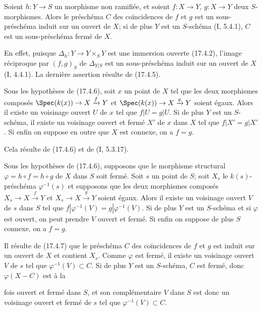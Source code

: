 \begin{proposition}[17.4.6]
\label{IV.17.4.6}
Soient $h:Y\to S$ un morphisme non ramifiée, et soient $f:X\to Y$, $g:X\to Y$ deux $S$-morphismes. Alors le préschéma $C$ des coïncidences de $f$ et $g$ est un sous-préschéma induit sur un ouvert de $X$; si de plus $Y$ est un $S$-schéma (I, 5.4.1), $C$ est un sous-préschéma fermé de $X$.
\end{proposition}

En effet, puisque $\Delta_h:Y\to Y\times_S Y$ est une immersion ouverte (17.4.2), l'image réciproque par $(f,g)_S$ de $\Delta_{Y|S}$ est un sous-préschéma induit sur un ouvert de $X$ (I, 4.4.1). La dernière assertion résulte de (17.4.5).

\begin{corollary}[17.4.7]
\label{IV.17.4.7}
Sous les hypothèses de (17.4.6), soit $x$ un point de $X$ tel que les deux morphismes composés $\Spec(k(x))\to X\xrightarrow{f}Y$ et $\Spec(k(x))\to X\xrightarrow{g}Y$ soient égaux. Alors il existe un voisinage ouvert $U$ de $x$ tel que $f|U=g|U$. Si de plus $Y$ est un $S$-schéma, il existe un voisinage ouvert et fermé $X'$ de $x$ dans $X$ tel que $f|X'=g|X'$. Si enfin on suppose en outre que $X$ est connexe, on a $f=g$.
\end{corollary}

Cela résulte de (17.4.6) et de (I, 5.3.17).

\begin{corollary}[17.4.8]
\label{IV.17.4.8}
Sous les hypothèses de (17.4.6), supposons que le morphisme structural $\varphi=h\circ f=h\circ g$ de $X$ dans $S$ soit fermé. Soit $s$ un point de $S$; soit $X_s$ le $k(s)$-préschéma $\varphi^{-1}(s)$ et supposons que les deux morphismes composés $X_s\to X\xrightarrow{f}Y$ et $X_s\to X\xrightarrow{g}Y$ soient égaux. Alors il existe un voisinage ouvert $V$ de $s$ dans $S$ tel que $f|\varphi^{-1}(V)=g|\varphi^{-1}(V)$. Si de plus $Y$ est un $S$-schéma et si $\varphi$ est ouvert, on peut prendre $V$ ouvert et fermé. Si enfin on suppose de plus $S$ connexe, on a $f=g$.
\end{corollary}

Il résulte de (17.4.7) que le préschéma $C$ des coïncidences de $f$ et $g$ est induit sur un ouvert de $X$ et contient $X_s$. Comme $\varphi$ est fermé, il existe un voisinage ouvert $V$ de $s$ tel que $\varphi^{-1}(V)\subset C$. Si de plus $Y$ est un $S$-schéma, $C$ est fermé, donc $\varphi(X-C)$ est à la

fois ouvert et fermé dans $S$, et son complémentaire $V$ dans $S$ est donc un voisinage ouvert et fermé de $s$ tel que $\varphi^{-1}(V)\subset C$.

